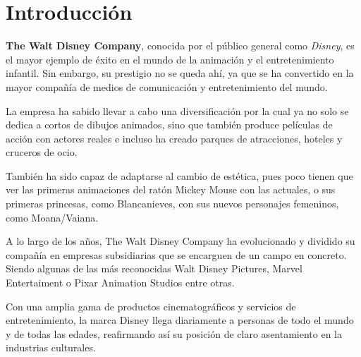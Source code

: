 \section{Introducción}
\textbf{The Walt Disney Company}, conocida por el público general como \textit{Disney}, es el mayor ejemplo de éxito en el mundo de la animación y el entretenimiento infantil. Sin embargo, su prestigio no se queda ahí, ya que se ha convertido en la mayor compañía de medios de comunicación y entretenimiento del mundo.

La empresa ha sabido llevar a cabo una diversificación por la cual ya no solo se dedica a cortos de dibujos animados, sino que también produce películas de acción con actores reales e incluso ha creado parques de atracciones, hoteles y cruceros de ocio.

También ha sido capaz de adaptarse al cambio de estética, pues poco tienen que ver las primeras animaciones del ratón Mickey Mouse con las actuales, o sus primeras princesas, como Blancanieves, con sus nuevos personajes femeninos, como Moana/Vaiana.

A lo largo de los años, The Walt Disney Company ha evolucionado y dividido su compañía en empresas subsidiarias que se encarguen de un campo en concreto. Siendo algunas de las más reconocidas Walt Disney Pictures, Marvel Entertaiment o Pixar Animation Studios entre otras.

Con una amplia gama de productos cinematográficos y servicios de entretenimiento, la marca Disney llega diariamente a personas de todo el mundo y de todas las edades, reafirmando así su posición de claro asentamiento en la industrias culturales.